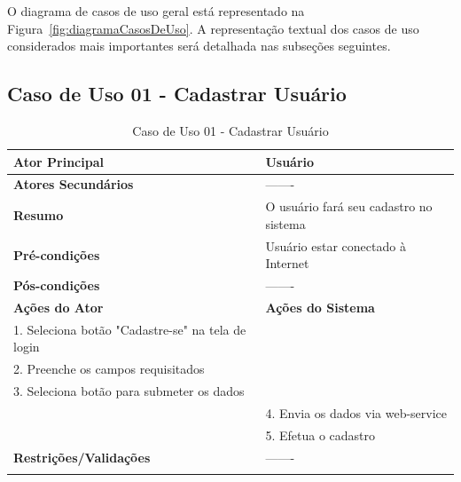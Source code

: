 O diagrama de casos de uso geral est\'{a} representado na Figura~\ref{fig:diagramaCasosDeUso}. A representa\c{c}\~{a}o textual dos casos de uso considerados mais importantes ser\'{a} detalhada nas subse\c{c}\~{o}es seguintes.




\subsection{Caso de Uso 01 - Cadastrar Usu\'{a}rio}

\begin{center}
\begin{longtable}{p{8cm}|p{8cm}}
    \hline
    \textbf{Ator Principal} & Usu\'{a}rio \\
    \hline
    \textbf{Atores Secund\'{a}rios} & ------- \\
    \hline
    \textbf{Resumo} &  O usu\'{a}rio far\'{a} seu cadastro no sistema\\
    \hline
    \textbf{Pr\'{e}-condi\c{c}\~{o}es} & Usu\'{a}rio estar conectado \`{a} Internet\\
    \hline
    \textbf{P\'{o}s-condi\c{c}\~{o}es} & ------- \\
    \hline
    \hline
    \textbf{A\c{c}\~{o}es do Ator} & \textbf{A\c{c}\~{o}es do Sistema} \\
    \hline
    1. Seleciona bot\~{a}o "Cadastre-se" na tela de login & \\
    \hline
    2. Preenche os campos requisitados & \\
    \hline
    3. Seleciona bot\~{a}o para submeter os dados & \\
    \hline
    & 4. Envia os dados via web-service \\
    \hline
    & 5. Efetua o cadastro \\
    \hline
    \hline
    \textbf{Restri\c{c}\~{o}es/Valida\c{c}\~{o}es} & -------\\
\hline
\caption{Caso de Uso 01 - Cadastrar Usu\'{a}rio}
\end{longtable}
\end{center}

